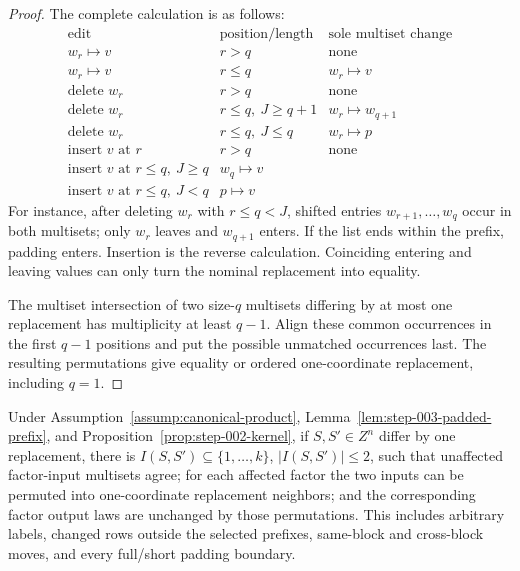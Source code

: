 \begin{proof}
The complete calculation is as follows:
\[
\begin{array}{c|c|c}
\text{edit}&\text{position/length}&\text{sole multiset change}\\ \hline
w_r\mapsto v&r>q&\text{none}\\
w_r\mapsto v&r\le q&w_r\mapsto v\\
\text{delete }w_r&r>q&\text{none}\\
\text{delete }w_r&r\le q,\ J\ge q+1&w_r\mapsto w_{q+1}\\
\text{delete }w_r&r\le q,\ J\le q&w_r\mapsto p\\
\text{insert }v\text{ at }r&r>q&\text{none}\\
\text{insert }v\text{ at }r\le q,\ J\ge q&w_q\mapsto v\\
\text{insert }v\text{ at }r\le q,\ J<q&p\mapsto v
\end{array}
\]
For instance, after deleting \(w_r\) with \(r\le q<J\), shifted entries
\(w_{r+1},\ldots,w_q\) occur in both multisets; only \(w_r\) leaves and
\(w_{q+1}\) enters.  If the list ends within the prefix, padding enters.
Insertion is the reverse calculation.  Coinciding entering and leaving
values can only turn the nominal replacement into equality.

The multiset intersection of two size-\(q\) multisets differing by at most
one replacement has multiplicity at least \(q-1\).  Align these common
occurrences in the first \(q-1\) positions and put the possible unmatched
occurrences last.  The resulting permutations give equality or ordered
one-coordinate replacement, including \(q=1\).
\end{proof}

\begin{proposition}
\label{prop:step-003-support-two}
Under Assumption~\ref{assump:canonical-product},
Lemma~\ref{lem:step-003-padded-prefix}, and
Proposition~\ref{prop:step-002-kernel}, if \(S,S'\in Z^n\) differ by one
replacement, there is \(I(S,S')\subseteq\{1,\ldots,k\}\),
\(|I(S,S')|\le2\), such that unaffected factor-input multisets agree; for
each affected factor the two inputs can be permuted into one-coordinate
replacement neighbors; and the corresponding factor output laws are
unchanged by those permutations.  This includes arbitrary labels, changed
rows outside the selected prefixes, same-block and cross-block moves, and
every full/short padding boundary.
\end{proposition}

